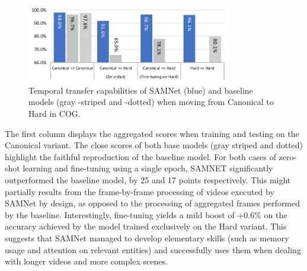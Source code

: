 \begin{figure}[htbp]
	\centering
	\includegraphics[width=0.8\textwidth]{../img/plots/cog_temporal_transfer_baselines.pdf}
	\caption{Temporal transfer capabilities of SAMNet (blue) and baseline models (gray -striped and -dotted) when moving from Canonical to Hard  in COG.}
	\label{fig:samnet_cog_overall_transfer}
\end{figure}

The first column displays the aggregated scores when training and testing on the Canonical variant.
The close scores of both base models (gray striped and dotted) highlight the faithful reproduction of the baseline model.
For both cases of zero-shot learning and fine-tuning using a single epoch, SAMNET significantly outperformed the baseline model, by 25 and 17 points respectively.
This might partially results from the frame-by-frame processing of videos executed by SAMNet by design, as opposed to the processing of aggregated frames performed by the baseline.
Interestingly, fine-tuning yields a mild boost of +0.6\% on the accuracy achieved by the model trained exclusively on the Hard variant.
This suggests that SAMNet managed to develop elementary skills (such as memory usage and attention on relevant entities) and successfully uses them when dealing with longer videos and more complex scenes.

